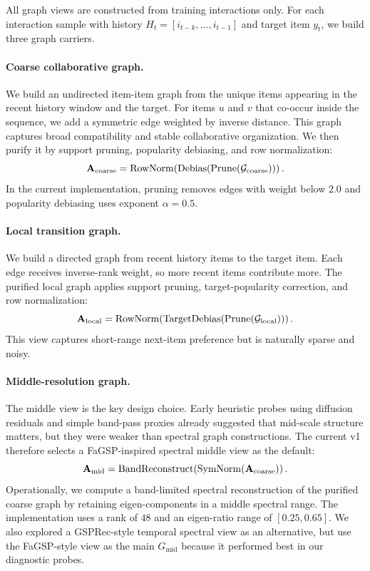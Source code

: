 All graph views are constructed from training interactions only. For each interaction sample with history $H_t = [i_{t-k}, \dots, i_{t-1}]$ and target item $y_t$, we build three graph carriers.

\paragraph{Coarse collaborative graph.}
We build an undirected item-item graph from the unique items appearing in the recent history window and the target. For items $u$ and $v$ that co-occur inside the sequence, we add a symmetric edge weighted by inverse distance. This graph captures broad compatibility and stable collaborative organization. We then purify it by support pruning, popularity debiasing, and row normalization:
\begin{equation}
\mathbf{A}_{\mathrm{coarse}} = \mathrm{RowNorm}\!\left( \mathrm{Debias}\!\left( \mathrm{Prune}(\mathcal{G}_{\mathrm{coarse}}) \right)\right).
\end{equation}
In the current implementation, pruning removes edges with weight below $2.0$ and popularity debiasing uses exponent $\alpha=0.5$.

\paragraph{Local transition graph.}
We build a directed graph from recent history items to the target item. Each edge receives inverse-rank weight, so more recent items contribute more. The purified local graph applies support pruning, target-popularity correction, and row normalization:
\begin{equation}
\mathbf{A}_{\mathrm{local}} = \mathrm{RowNorm}\!\left( \mathrm{TargetDebias}\!\left( \mathrm{Prune}(\mathcal{G}_{\mathrm{local}}) \right)\right).
\end{equation}
This view captures short-range next-item preference but is naturally sparse and noisy.

\paragraph{Middle-resolution graph.}
The middle view is the key design choice. Early heuristic probes using diffusion residuals and simple band-pass proxies already suggested that mid-scale structure matters, but they were weaker than spectral graph constructions. The current v1 therefore selects a FaGSP-inspired spectral middle view as the default:
\begin{equation}
\mathbf{A}_{\mathrm{mid}} = \mathrm{BandReconstruct}\!\left( \mathrm{SymNorm}(\mathbf{A}_{\mathrm{coarse}})\right).
\end{equation}
Operationally, we compute a band-limited spectral reconstruction of the purified coarse graph by retaining eigen-components in a middle spectral range. The implementation uses a rank of $48$ and an eigen-ratio range of $[0.25, 0.65]$. We also explored a GSPRec-style temporal spectral view as an alternative, but use the FaGSP-style view as the main $G_{\mathrm{mid}}$ because it performed best in our diagnostic probes.

